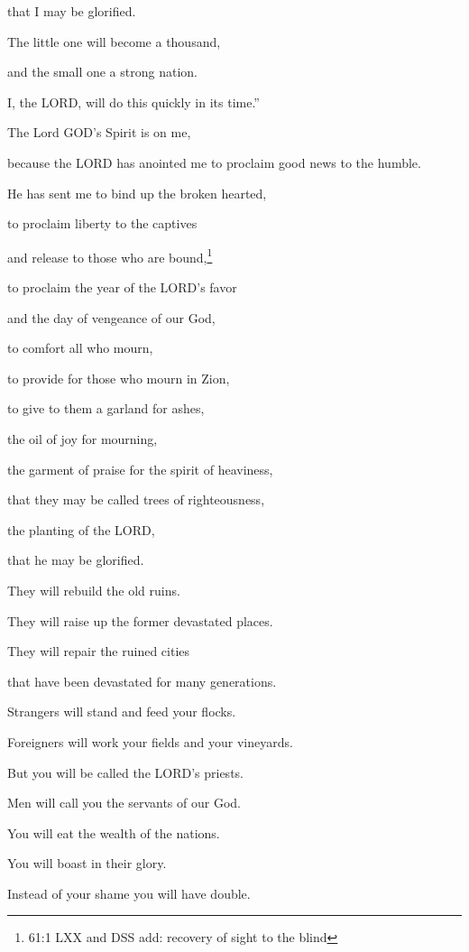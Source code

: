 that I may be glorified.

\myverse{}The little one will become a thousand,

and the small one a strong nation.

I, the LORD, will do this quickly in its time.”


\mychapter{} \myverse*{}The Lord GOD’s Spirit is on me,

\quad\quad because the LORD has anointed me to proclaim good news to the humble.

He has sent me to bind up the broken hearted,

to proclaim liberty to the captives

and release to those who are bound,\footnote{61:1 LXX and DSS add: recovery of sight to the blind}

\myverse{}to proclaim the year of the LORD’s favor

and the day of vengeance of our God,

to comfort all who mourn,

\myverse{}to provide for those who mourn in Zion,

to give to them a garland for ashes,

the oil of joy for mourning,

the garment of praise for the spirit of heaviness,

that they may be called trees of righteousness,

the planting of the LORD,

that he may be glorified.


\vspace{\baselineskip} \myverse{}They will rebuild the old ruins.

They will raise up the former devastated places.

They will repair the ruined cities

that have been devastated for many generations.

\myverse{}Strangers will stand and feed your flocks.

Foreigners will work your fields and your vineyards.

\myverse{}But you will be called the LORD’s priests.

Men will call you the servants of our God.

You will eat the wealth of the nations.

You will boast in their glory.

\myverse{}Instead of your shame you will have double.

